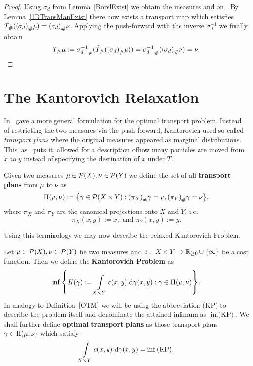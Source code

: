 \begin{proof}
	Using $\sigma_d$ from Lemma~\ref{BorelExist} we obtain the measures \push[(\sigma_d)]{\mu} and \push[(\sigma_d)]{\nu} on \R. By Lemma~\ref{1DTransMapExist} there now exists a transport map \map[\tilde{T}]{\R}{\R} which satisfies $\push[\tilde{T}]{(\push[(\sigma_d)]{\mu})} = \push[(\sigma_d)]{\nu}$. Applying the push-forward with the inverse $\sigma_d^{-1}$ we finally obtain
	\[ \push{\mu} := \push[\sigma_d^{-1}]{(\push[\tilde{T}]{(\push[(\sigma_d)]{\mu})})} = \push[\sigma_d^{-1}]{(\push[(\sigma_d)]{\nu})} = \nu. \]
\end{proof}

\section{The Kantorovich Relaxation}\label{KantRelax}
In~\cite{Kan1942} gave a more general formulation for the optimal transport problem. Instead of restricting the two measures via the push-forward, Kantorovich used so called \textit{transport plans} where the original measures appeared as marginal distributions. This, as~\cite{San2015} puts it,  allowed for a description ofhow many particles are moved from $x$ to $y$ instead of specifying the destination of $x$ under $T$.

\begin{definition}\label{TransPlans}
	Given two measures $\mu \in \PM{X}, \nu \in \PM{Y}$ we define the set of all \textbf{transport plans} from $\mu$ to $\nu$ as
	\[ \TP{\mu}{\nu} := \big\{ \gamma \in \PM{X \times Y} : \push[(\pi_X)]{\gamma} = \mu, \push[(\pi_Y)]{\gamma} = \nu \big\}, \]
	where $\pi_X$ and $\pi_Y$ are the canonical projections onto $X$ and $Y$, i.e.
	\[ \pi_X(x, y) := x, \text{ and } \pi_Y(x, y) := y. \]
\end{definition}

Using this terminology we may now describe the relaxed Kantorovich Problem.

\begin{definition}\label{KanProb}
	Let $\mu \in \PM{X}, \nu \in \PM{Y}$ be two measures and $\map[c]{X \times Y}{\RZero \cup \{\infty\}}$ be a cost function. Then we define the \textbf{Kantorovich Problem} as
	\begin{equation}\label{KP}
		\inf \left\{ K(\gamma) := \int\limits_{X \times Y} c(x, y)~\Dx[x, y]{\gamma} : \gamma \in \TP{\mu}{\nu} \right\}.
	\end{equation}
	In analogy to Definition~\ref{OTM} we will be using the abbreviation (KP) to describe the problem itself and denominate the attained infimum as $\inf \text{(KP)}$. We shall further define \textbf{optimal transport plans} as those transport plans $\gamma \in \TP{\mu}{\nu}$ which satisfy
	\[ \int\limits_{X \times Y} c(x, y)~\Dx[x, y]{\gamma} = \inf \text{(KP)}. \]
\end{definition}

